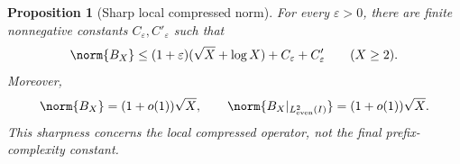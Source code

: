 \documentclass[11pt,a4paper]{article}
\numberwithin{equation}{section}
\newtheorem{proposition}[theorem]{Proposition}
\theoremstyle{definition}\newtheorem{definition}[theorem]{Definition}
\theoremstyle{remark}\newtheorem{remark}[theorem]{Remark}
\begin{document}
\begin{proposition}[Sharp local compressed norm]\label{sw:prop:schur}
For every $\varepsilon>0$, there are finite nonnegative constants $C_\varepsilon,C'_\varepsilon$ such that
\begin{equation}\label{sw:eq:schur-finite}
 \norm{B_X}\le(1+\varepsilon)(\sqrt X+\log X)
                         +C_\varepsilon+C'_\varepsilon
 \qquad(X\ge2).
\end{equation}
Moreover,
\begin{equation}\label{sw:eq:schur-asymptotic}
 \norm{B_X}=(1+o(1))\sqrt X,
 \qquad
 \norm{B_X|_{L^2_{\rm even}(I)}}=(1+o(1))\sqrt X.
\end{equation}
This sharpness concerns the local compressed operator, not the final prefix-complexity constant.
\end{proposition}
\end{document}
